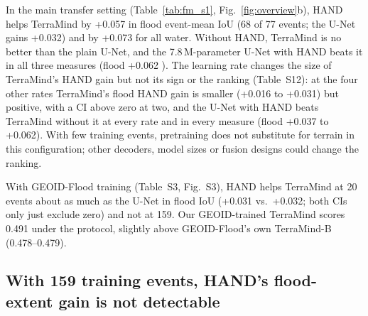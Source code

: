 \begin{table}[t]
\caption{TerraMind ± HAND trained on the 11 Sen1Floods11 events (pre-registered; learning rate $10^{-4}$,
selected on validation; 3 seeds; all 77/79 GEOID-Flood test events; two-way 95\% CIs). TM: TerraMind-1.0-base,
fine-tuned. Every learning rate: Table~S12.}
\label{tab:fm_s1}
\centering
{}
\end{table}

In the main transfer setting (Table~\ref{tab:fm_s1}, Fig.~\ref{fig:overview}b), HAND helps TerraMind by
+0.057  in flood event-mean IoU (68 of 77 events; the U-Net gains +0.032) and by +0.073
for all water. Without HAND, TerraMind is no better than the plain U-Net, and the 7.8\,M-parameter U-Net with
HAND beats it in all three measures (flood +0.062 ). The learning rate changes the size of
TerraMind's HAND gain but not its sign or the ranking (Table~S12): at the four other rates TerraMind's flood HAND gain is smaller (+0.016 to +0.031)
but positive, with a CI above zero at two, and the U-Net with HAND beats TerraMind without it at every rate
and in every measure (flood +0.037 to +0.062). With few training events, pretraining does not substitute for
terrain in this configuration; other decoders, model sizes or fusion designs could change the ranking.

With GEOID-Flood training (Table~S3, Fig.~S3), HAND helps TerraMind at 20 events about as much as the
U-Net in flood IoU (+0.031 vs.\ +0.032; both CIs only just exclude zero) and not at 159. Our GEOID-trained
TerraMind scores 0.491 under the protocol, slightly above GEOID-Flood's own TerraMind-B (0.478--0.479).


\subsection{With 159 training events, HAND's flood-extent gain is not detectable}
\label{sec:geoid}

